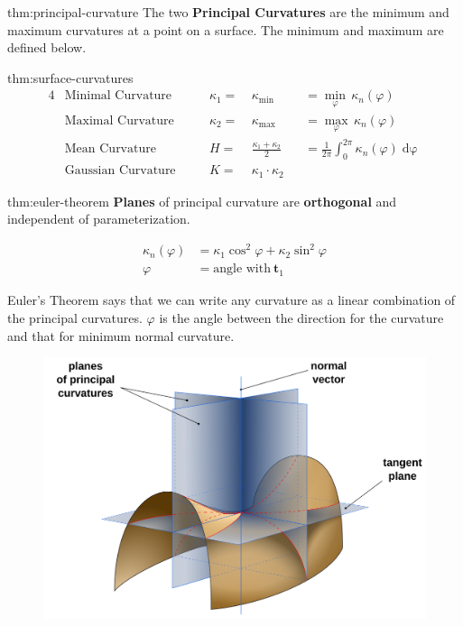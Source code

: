 \documentclass{article}
\begin{document}
\begin{defin}{thm:principal-curvature}
    The two \textbf{Principal Curvatures} are the minimum and maximum curvatures at a point on a surface. The 
    minimum and maximum are defined below.
\end{defin}


\begin{defin}{thm:surface-curvatures}
    \begin{alignat*}{4}
        &\text{Minimal Curvature} \qquad &\kappa_{1} =& \ \kappa_{\text{min}} &&= \underset{\varphi}{\operatorname{min}} \, \kappa_{n}(\varphi)\\
        &\text{Maximal Curvature} \qquad &\kappa_{2} =& \ \kappa_{\text{max}} &&= \underset{\varphi}{\operatorname{max}} \, \kappa_{n}(\varphi)\\
        &\text{Mean Curvature} &H =& \ \frac{\kappa_{1} + \kappa_{2}}{2} &&= \frac{1}{2\pi} \int_{0}^{2\pi} \kappa_{n}(\varphi) \operatorname{d\varphi}\\
        &\text{Gaussian Curvature} &K =& \ \kappa_{1} \cdot \kappa_{2}
    \end{alignat*}
\end{defin}


\newpage

\begin{theo}{thm:euler-theorem}
    \textbf{Planes} of principal curvature are \textbf{orthogonal} and independent of parameterization.

    \begin{align*}
        \kappa_{n}(\varphi) &= \kappa_{1}\cos^2 \varphi + \kappa_{2} \sin^2 \varphi\\
        \varphi &= \text{angle with} \ \mathbf{t}_{1}
    \end{align*}
\end{theo}

Euler's Theorem says that we can write any curvature as a linear combination of the principal curvatures. 
\(\varphi\) is the angle between the direction for the curvature and that for minimum normal curvature.


\begin{figure}[!ht]
    \centering
    \includegraphics[width=0.5\linewidth]{images/principal_curvature.png}
\end{figure}
\end{document}
